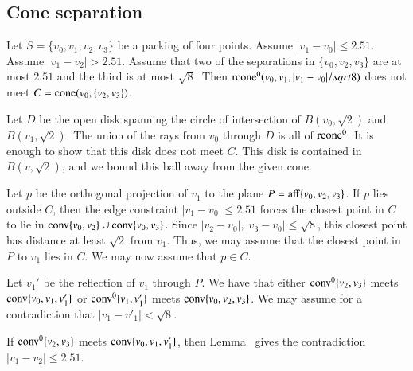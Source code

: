 \begin{tarskidata}
\begin{tarski}
\section{Cone separation}

\begin{lemma}
Let $S=\{v_0,v_1,v_2,v_3\}$ be a packing of four points.
Assume $|v_1-v_0|\le 2.51$. Assume $|v_1-v_2|>2.51$.
Assume that two of the separations in $\{v_0,v_2,v_3\}$ are at
          most $2.51$ and the third is at most $\sqrt8$.
     Then ${\operatorname{rcone}}^0(v_0,v_1,|v_1-v_0|/sqrt8)$ does not meet
$C = {\operatorname{cone}}(v_0,\{v_2,v_3\})$.
\end{lemma}

\begin{proved}
Let $D$ be the open disk spanning the circle of intersection of
$B(v_0,\sqrt2)$ and $B(v_1,\sqrt2)$.  The union of the rays from $v_0$
through $D$ is all of ${\operatorname{rcone}}^0$.  It is enough to show that this
disk does not meet $C$.  This disk is contained in $B(v,\sqrt2)$,
and  we bound this ball away from the given cone.

Let $p$ be the orthogonal 
projection of $v_1$ to the plane $P={\operatorname{aff}}\{v_0,v_2,v_3\}$.
If $p$  lies outside $C$, then the
edge constraint $|v_1-v_0|\le 2.51$ forces the closest point in $C$ to
lie in ${\operatorname{conv}}\{v_0,v_2\}\cup{\operatorname{conv}}\{v_0,v_3\}$.  Since
$|v_2-v_0|,|v_3-v_0|\le\sqrt8$, this closest point has distance at least
$\sqrt2$ from $v_1$. Thus, we may assume that the closest point in
$P$ to $v_1$ lies in $C$.
We may now assume that $p\in C$.

Let $v_1'$ be the reflection of $v_1$ through $P$.  We
have that either ${\operatorname{conv}}^0\{v_2,v_3\}$ meets ${\operatorname{conv}}\{v_0,v_1,v'_1\}$ or
${\operatorname{conv}}^0\{v_1,v'_1\}$ meets ${\operatorname{conv}}\{v_0,v_2,v_3\}$.  We may assume for
a contradiction that $|v_1-v'_1|<\sqrt8$.

If ${\operatorname{conv}}^0\{v_2,v_3\}$ meets ${\operatorname{conv}}\{v_0,v_1,v'_1\}$, then
Lemma~ gives the contradiction
$|v_1-v_2|\le2.51$.


\end{proved}
\end{tarski}
\end{tarskidata}
